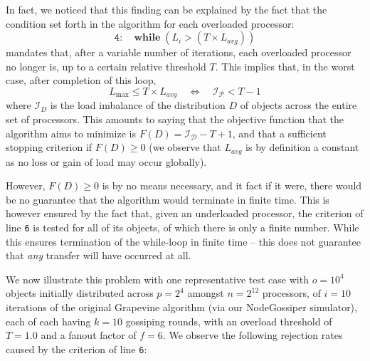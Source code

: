 In fact, we noticed that this finding can be explained by the fact
that the condition set forth in the algorithm for each overloaded
processor:
\[
\mathtt{4:} \quad \mathrm{\mathbf{while}} \; (L_i > (T \times L_{avg}))
\]
mandates that, after a variable number of iterations, each overloaded
processor no longer is, up to a certain relative threshold $T$.
This implies that, in the worst case, after completion of this loop,
\[
\label{eq:imbalance}
L_{\max} \le T \times L_{avg}
\quad \Longleftrightarrow \quad
\mathcal{I_P} < T - 1
\]
where $\mathcal{I}_D$ is the load imbalance of the distribution $D$ of
objects across the entire set of processors. This amounts to
saying that the objective function that the algorithm aims to minimize
is $F(D)=\mathcal{I_D}-T+1$, and that a sufficient stopping criterion
if $F(D)\ge0$ (we observe that $L_{avg}$ is by definition a constant
as no loss or gain of load may occur globally). 

However, $F(D)\ge0$ is by no means necessary, and it fact if it were,
there would be no guarantee that the algorithm would terminate in
finite time. This is however ensured by the fact that, given an
underloaded processor, the criterion of line \texttt{6} is tested for
all of its objects, of which there is only a finite number.
While this ensures termination of the while-loop in finite time --
this does not guarantee that \emph{any} transfer will have occurred at
all.

We now illustrate this problem with one representative test case
with $o=10^4$ objects initially distributed across $p=2^4$
amongst $n=2^{12}$ processors, of $i=10$ iterations of the original
Grapevine algorithm (via our \textsf{NodeGossiper} simulator), each of
each having $k=10$ gossiping rounds, with an overload threshold of
$T=1.0$ and a fanout factor of $f=6$.
We observe the following rejection rates caused by the criterion of line \texttt{6}:

